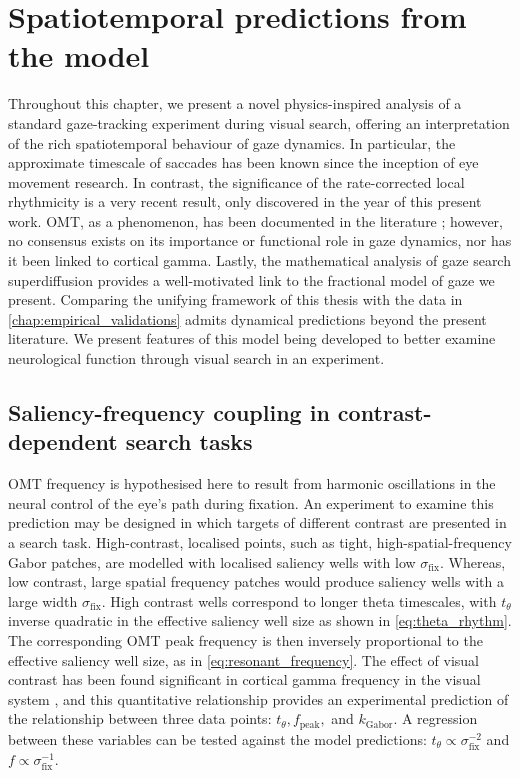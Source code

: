\newpage
\section{Spatiotemporal predictions from the model}\label{sec:spatiotemporal_predictions}

Throughout this chapter, we present a novel physics-inspired analysis of a standard gaze-tracking experiment during visual search, offering an interpretation of the rich spatiotemporal behaviour of gaze dynamics. In particular, the approximate timescale of saccades has been known since the inception of eye movement research. In contrast, the significance of the rate-corrected local rhythmicity is a very recent result, only discovered in the year of this present work. OMT, as a phenomenon, has been documented in the literature \cite{graham_ocular_2023}; however, no consensus exists on its importance or functional role in gaze dynamics, nor has it been linked to cortical gamma. Lastly, the mathematical analysis of gaze search superdiffusion provides a well-motivated link to the fractional model of gaze we present. Comparing the unifying framework of this thesis with the data in \cref{chap:empirical_validations} admits dynamical predictions beyond the present literature. We present features of this model being developed to better examine neurological function through visual search in an experiment.
\subsection{Saliency-frequency coupling in contrast-dependent
search tasks}\label{subsec:saliency-frequency}
OMT frequency is hypothesised here to result from harmonic oscillations in the neural control of the eye's path during fixation. An experiment to examine this prediction may be designed in which targets of different contrast are presented in a search task. High-contrast, localised points, such as tight, high-spatial-frequency Gabor patches, are modelled with localised saliency wells with low $\sigma_{\text{fix}}$. Whereas, low contrast, large spatial frequency patches would produce saliency wells with a large width $\sigma_{\text{fix}}$. High contrast wells correspond to longer theta timescales, with $t_{\theta}$ inverse quadratic in the effective saliency well size as shown in \cref{eq:theta_rhythm}. The corresponding OMT peak frequency is then inversely proportional to the effective saliency well size, as in \cref{eq:resonant_frequency}. The effect of visual contrast has been found significant in cortical gamma frequency in the visual system \cite{le_gamma_2019, baranauskas_spatial_2016, han_gamma_2022, RAY2010885}, and this quantitative relationship provides an experimental prediction of the relationship between three data points: $t_{\theta}, f_{\text{peak}},$ and $k_{\text{Gabor}}$. A regression between these variables can be tested against the model predictions: $t_{\theta} \propto \sigma_{\text{fix}}^{-2}$ and $f \propto \sigma_{\text{fix}}^{-1}$.
